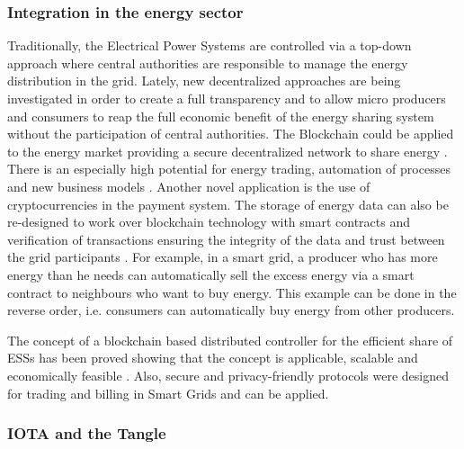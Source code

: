 \subsubsection{Integration in the energy sector}

Traditionally, the Electrical Power Systems are controlled via a top-down approach where central authorities are responsible to manage the energy distribution in the grid. Lately, new decentralized approaches are being investigated in order to create a full transparency and to allow micro producers and consumers to reap the full economic benefit of the energy sharing system without the participation of central authorities. The Blockchain could be applied to the energy market providing a secure decentralized network to share energy \cite{Hasse2016}. There is an especially high potential for energy trading, automation of processes and new business models \cite{UseCasesforBlockchainTechnologyinEnergyCommodityTrading}. Another novel application is the use of cryptocurrencies in the payment system. The storage of energy data can also be re-designed to work over blockchain technology with smart contracts and verification of transactions ensuring the integrity of the data and trust between the grid participants \cite{ETHome:Opensourceblockchainbasedenergycommunitycontroller}. For example, in a smart grid, a producer who has more energy than he needs can automatically sell the excess energy via a smart contract to neighbours who want to buy energy. This example can be done in the reverse order, i.e. consumers can automatically buy energy from other producers.


 The concept of a blockchain based distributed controller for the efficient share of \acp{ESS}  has been proved showing that the concept is applicable, scalable and economically feasible \cite{ETHome:Opensourceblockchainbasedenergycommunitycontroller}. Also, secure and privacy-friendly protocols were designed for trading and billing in Smart Grids \cite{SecureandPrivacy-FriendlyLocalElectricityTradingandBillinginSmartGrid} and can be applied. 

\subsubsection{IOTA and the Tangle}


